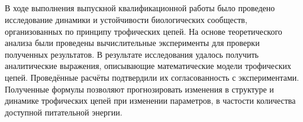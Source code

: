 \begin{center}
    \section*{}
\end{center}
\thispagestyle{empty}

В ходе выполнения выпускной квалификационной работы было проведено исследование динамики и устойчивости биологических сообществ, организованных по принципу трофических цепей. На основе теоретического анализа были проведены вычислительные эксперименты для проверки полученных результатов.
В результате исследования удалось получить аналитические выражения, описывающие математические модели трофических цепей. Проведённые расчёты подтвердили их согласованность с экспериментами. 
Полученные формулы позволяют прогнозировать изменения в структуре и динамике трофических цепей при изменении параметров, в частости количества доступной питательной энергии.
